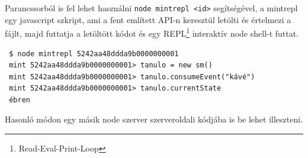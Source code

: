 Parancssorból is fel lehet használni \lstinline{node mintrepl <id>} segítségével, a mintrepl egy javascript szkript, ami a fent említett API-n keresztül letölti és értelmezi a fájlt, majd futtatja a letöltött kódot és egy REPL\footnote{Read-Eval-Print-Loop} interaktív node shell-t futtat. 

\begin{lstlisting}
 $ node mintrepl 5242aa48ddda9b0000000001
 mint 5242aa48ddda9b0000000001> tanulo = new sm()
 mint 5242aa48ddda9b0000000001> tanulo.consumeEvent("kávé")
 mint 5242aa48ddda9b0000000001> tanulo.currentState
 ébren
 \end{lstlisting}

 Hasonló módon egy másik node szerver szerveroldali kódjába is be lehet illeszteni. 
 






